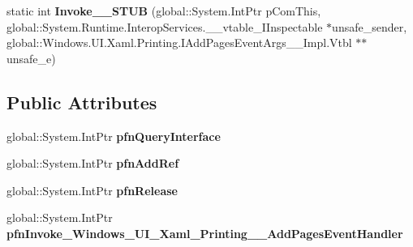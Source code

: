 \begin{DoxyCompactItemize}
\item 
\mbox{\label{struct_windows_1_1_u_i_1_1_xaml_1_1_printing_1_1_add_pages_event_handler_____impl_1_1_vtbl_ad8f7bae7b796ed603b6e0b16206114de}} 
static int {\bfseries Invoke\+\_\+\+\_\+\+S\+T\+UB} (global\+::\+System.\+Int\+Ptr p\+Com\+This, global\+::\+System.\+Runtime.\+Interop\+Services.\+\_\+\+\_\+vtable\+\_\+\+I\+Inspectable $\ast$unsafe\+\_\+sender, global\+::\+Windows.\+U\+I.\+Xaml.\+Printing.\+I\+Add\+Pages\+Event\+Args\+\_\+\+\_\+\+Impl.\+Vtbl $\ast$$\ast$unsafe\+\_\+e)
\end{DoxyCompactItemize}
\subsection*{Public Attributes}
\begin{DoxyCompactItemize}
\item 
\mbox{\label{struct_windows_1_1_u_i_1_1_xaml_1_1_printing_1_1_add_pages_event_handler_____impl_1_1_vtbl_a58f74a4576d4daf1af62363fb8860c78}} 
global\+::\+System.\+Int\+Ptr {\bfseries pfn\+Query\+Interface}
\item 
\mbox{\label{struct_windows_1_1_u_i_1_1_xaml_1_1_printing_1_1_add_pages_event_handler_____impl_1_1_vtbl_a0e862c26949b21df03350ef2589c8cce}} 
global\+::\+System.\+Int\+Ptr {\bfseries pfn\+Add\+Ref}
\item 
\mbox{\label{struct_windows_1_1_u_i_1_1_xaml_1_1_printing_1_1_add_pages_event_handler_____impl_1_1_vtbl_a0826ed29f0c9fd57d33392661a516534}} 
global\+::\+System.\+Int\+Ptr {\bfseries pfn\+Release}
\item 
\mbox{\label{struct_windows_1_1_u_i_1_1_xaml_1_1_printing_1_1_add_pages_event_handler_____impl_1_1_vtbl_a6d46450b4c10280eea678bf01cb321b1}} 
global\+::\+System.\+Int\+Ptr {\bfseries pfn\+Invoke\+\_\+\+Windows\+\_\+\+U\+I\+\_\+\+Xaml\+\_\+\+Printing\+\_\+\+\_\+\+Add\+Pages\+Event\+Handler}
\end{DoxyCompactItemize}
